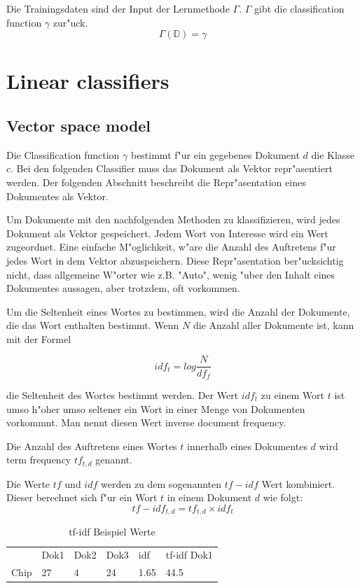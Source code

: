 \documentclass[12pt,a4paper,twoside]{article}
\begin{document}
Die Trainingsdaten sind der Input der Lernmethode $\Gamma$. $\Gamma$ gibt die classification function $\gamma$ zur"uck.
\[
\Gamma(\mathbb{D}) = \gamma
\]

\section{Linear classifiers}
\label{sec:linearclassifiers}

\subsection{Vector space model}
\label{sec:vectorspacemodel}
Die Classification function $\gamma$ bestimmt f"ur ein gegebenes Dokument $d$ die Klasse $c$. Bei den folgenden Classifier muss das Dokument als Vektor re\-pr"as\-entiert werden. Der folgenden Abschnitt beschreibt die Repr"asentation eines Dokumentes als Vektor.

Um Dokumente mit den nachfolgenden Methoden zu klassifizieren, wird jedes Dokument als Vektor gespeichert. Jedem Wort von Interesse wird ein Wert zugeordnet. Eine einfache M"oglichkeit, w"are die Anzahl des Auftretens f"ur jedes Wort in dem Vektor abzuspeichern. Diese Repr"asentation ber"ucksichtig nicht, dass allgemeine W"orter wie z.B. "Auto", wenig "uber den Inhalt eines Dokumentes aussagen, aber trotzdem, oft vorkommen.

Um die Seltenheit eines Wortes zu bestimmen, wird die Anzahl der Dokumente, die das Wort enthalten bestimmt. Wenn $N$ die Anzahl aller Dokumente ist, kann mit der Formel

\[
idf_t = log \frac{ N}{df_f}
\]

die Seltenheit des Wortes bestimmt werden. Der Wert $idf_t$ zu einem Wort $t$ ist umso h"oher umso seltener ein Wort in einer Menge von Dokumenten vorkommnt. Man nennt diesen Wert inverse document frequency\cite{manning08}.

Die Anzahl des Auftretens eines Wortes $t$ innerhalb eines Dokumentes $d$ wird term frequency $tf_{t,d}$ genannt.

Die Werte $tf$ und $idf$ werden zu dem sogenannten $tf-idf$ Wert kombiniert. Dieser berechnet sich f"ur ein Wort $t$ in einem Dokument $d$ wie folgt:
\[
tf-idf_{t,d} = tf_{t,d} \times idf_t
\]

\begin{table}
  \centering
  \begin{tabular}{l l l l l l}
    & Dok1 & Dok2 & Dok3 & idf & tf-idf Dok1 \\
    Chip & 27 & 4 & 24 & 1.65 &44.5  \\
  \end{tabular}
  \caption{tf-idf Beispiel Werte }
  \label{tab:temporal_operators}
\end{table}
\end{document}
